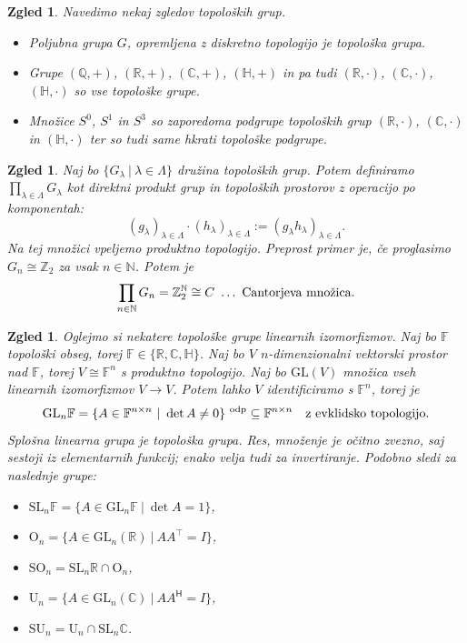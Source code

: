 \documentclass[10pt, a4paper]{article}
\newtheorem{zgled}[izr]{Zgled}
\newcommand{\N}{\mathbb {N}}
\newcommand{\Z}{\mathbb {Z}}
\newcommand{\Q}{\mathbb {Q}}
\newcommand{\R}{\mathbb {R}}
\newcommand{\C}{\mathbb {C}}
\newcommand{\Ha}{\mathbb {H}}
\newcommand{\F}{\mathbb {F}}
\begin{document}
\begin{zgled}
  Navedimo nekaj zgledov topoloških grup.
  \begin{itemize}
    \item Poljubna grupa $G$, opremljena z diskretno topologijo je topološka grupa.
    \item Grupe $(\Q, +)$, $(\R, +)$, $(\C, +)$, $(\Ha, +)$ in pa tudi $(\R, \cdot)$, $(\C, \cdot)$, $(\Ha, \cdot)$
    so vse topološke grupe.
    \item Množice $S^0$, $S^1$ in $S^3$ so zaporedoma podgrupe topoloških grup $(\R, \cdot)$, $(\C, \cdot)$ in $(\Ha, \cdot)$
    ter so tudi same hkrati topološke podgrupe.
  \end{itemize}
\end{zgled}

\begin{zgled}
  Naj bo $\{G_\lambda\ |\ \lambda \in \Lambda\}$ družina topoloških grup.
  Potem definiramo $\prod_{\lambda \in \Lambda} G_\lambda$ kot direktni produkt grup 
  in topoloških prostorov z operacijo po komponentah:
  $$(g_\lambda)_{\lambda \in \Lambda} \cdot (h_\lambda)_{\lambda \in \Lambda} := (g_\lambda h_\lambda)_{\lambda \in \Lambda}.$$
  Na tej množici vpeljemo produktno topologijo. Preprost primer je, če proglasimo 
  $G_n \cong \Z_2$ za vsak $n \in \N$. Potem je 
  $$\prod_{n \in \N} G_n = \Z_2^{\N} \cong C\ \ldots\ \textup{Cantorjeva množica}.$$
\end{zgled}

\begin{zgled}
  Oglejmo si nekatere topološke grupe linearnih izomorfizmov.
  Naj bo $\mathbb{F}$ topološki obseg, torej $\mathbb{F} \in \{\R, \C, \Ha\}$.
  Naj bo $V$ $n$-dimenzionalni vektorski prostor nad $\mathbb{F}$, torej 
  $V \cong \mathbb{F}^n$ s produktno topologijo. Naj bo $\mathrm{GL}(V)$
  množica vseh linearnih izomorfizmov $V \to V$.
  Potem lahko $V$ identificiramo s $\mathbb{F}^n$, torej je 
  $$\mathrm{GL}_n \mathbb{F} = \{A \in \mathbb{F}^{n \times n}\ |\ \det A \neq 0\}^{\ \textup{odp}} \subseteq \mathbb{F}^{n \times n}\quad \textup{z evklidsko topologijo.}$$
  Splošna linearna grupa je topološka grupa. Res, množenje je očitno zvezno,
  saj sestoji iz elementarnih funkcij; enako velja tudi za invertiranje.
  Podobno sledi za naslednje grupe:
  \begin{itemize}
    \item $\mathrm{SL}_n \F = \{A \in \mathrm{GL}_n \F\ |\ \det A = 1\}$,
    \item $\mathrm{O}_n = \{A \in \mathrm{GL}_n (\R)\ |\ A A^\top = I\}$,
    \item $\mathrm{SO}_n = \mathrm{SL}_n \R \cap \mathrm{O}_n$,
    \item $\mathrm{U}_n = \{A \in \mathrm{GL}_n (\C)\ |\ A A^\mathsf{H} = I\}$,
    \item $\mathrm{SU}_n = \mathrm{U}_n \cap \mathrm{SL}_n \C$.
  \end{itemize}
\end{zgled}
\end{document}
